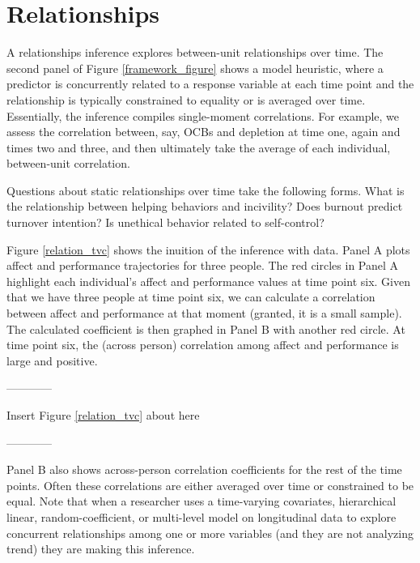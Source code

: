 \documentclass[english,,man]{apa6}
\begin{document}
\hypertarget{relationships}{%
\section{Relationships}\label{relationships}}

A relationships inference explores between-unit relationships over time. The second panel of Figure \ref{framework_figure} shows a model heuristic, where a predictor is concurrently related to a response variable at each time point and the relationship is typically constrained to equality or is averaged over time. Essentially, the inference compiles single-moment correlations. For example, we assess the correlation between, say, OCBs and depletion at time one, again and times two and three, and then ultimately take the average of each individual, between-unit correlation.

Questions about static relationships over time take the following forms. What is the relationship between helping behaviors and incivility? Does burnout predict turnover intention? Is unethical behavior related to self-control?

Figure \ref{relation_tvc} shows the inuition of the inference with data. Panel A plots affect and performance trajectories for three people. The red circles in Panel A highlight each individual's affect and performance values at time point six. Given that we have three people at time point six, we can calculate a correlation between affect and performance at that moment (granted, it is a small sample). The calculated coefficient is then graphed in Panel B with another red circle. At time point six, the (across person) correlation among affect and performance is large and positive.

\begin{center}

------------

Insert Figure \ref{relation_tvc} about here

------------

\end{center}

Panel B also shows across-person correlation coefficients for the rest of the time points. Often these correlations are either averaged over time or constrained to be equal. Note that when a researcher uses a time-varying covariates, hierarchical linear, random-coefficient, or multi-level model on longitudinal data to explore concurrent relationships among one or more variables (and they are not analyzing trend) they are making this inference.
\end{document}
